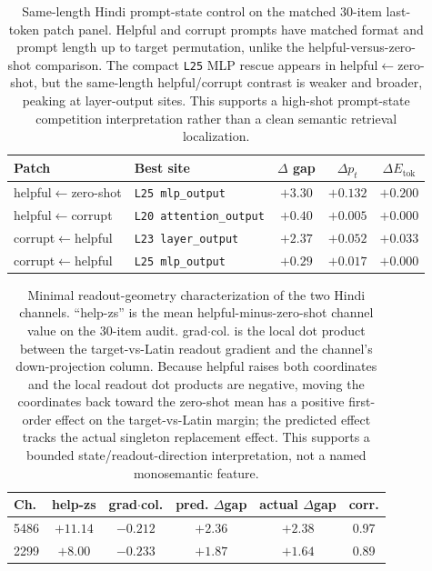 \documentclass{article}
\begin{document}
\begin{table}[H]
\centering
\small
\setlength{\tabcolsep}{5pt}
\begin{tabular}{llccc}
\toprule
\textbf{Patch} & \textbf{Best site} & \textbf{$\Delta$ gap} & \textbf{$\Delta p_t$} & \textbf{$\Delta E_{\mathrm{tok}}$} \\
\midrule
helpful$\leftarrow$zero-shot & \texttt{L25 mlp\_output} & $+3.30$ & $+0.132$ & $+0.200$ \\
helpful$\leftarrow$corrupt & \texttt{L20 attention\_output} & $+0.40$ & $+0.005$ & $+0.000$ \\
corrupt$\leftarrow$helpful & \texttt{L23 layer\_output} & $+2.37$ & $+0.052$ & $+0.033$ \\
corrupt$\leftarrow$helpful & \texttt{L25 mlp\_output} & $+0.29$ & $+0.017$ & $+0.000$ \\
\bottomrule
\end{tabular}
\caption{Same-length Hindi prompt-state control on the matched 30-item last-token patch panel. Helpful and corrupt prompts have matched format and prompt length up to target permutation, unlike the helpful-versus-zero-shot comparison. The compact \texttt{L25} MLP rescue appears in helpful$\leftarrow$zero-shot, but the same-length helpful/corrupt contrast is weaker and broader, peaking at layer-output sites. This supports a high-shot prompt-state competition interpretation rather than a clean semantic retrieval localization.}
\label{tab:hindi_same_length}
\end{table}

\begin{table}[H]
\centering
\small
\setlength{\tabcolsep}{6pt}
\begin{tabular}{lccccc}
\toprule
\textbf{Ch.} & \textbf{help-zs} & \textbf{grad$\cdot$col.} & \textbf{pred. $\Delta$gap} & \textbf{actual $\Delta$gap} & \textbf{corr.} \\
\midrule
5486 & $+11.14$ & $-0.212$ & $+2.36$ & $+2.38$ & 0.97 \\
2299 & $+8.00$  & $-0.233$ & $+1.87$ & $+1.64$ & 0.89 \\
\bottomrule
\end{tabular}
\caption{Minimal readout-geometry characterization of the two Hindi channels. ``help-zs'' is the mean helpful-minus-zero-shot channel value on the 30-item audit. grad$\cdot$col. is the local dot product between the target-vs-Latin readout gradient and the channel's down-projection column. Because helpful raises both coordinates and the local readout dot products are negative, moving the coordinates back toward the zero-shot mean has a positive first-order effect on the target-vs-Latin margin; the predicted effect tracks the actual singleton replacement effect. This supports a bounded state/readout-direction interpretation, not a named monosemantic feature.}
\label{tab:hindi_channel_readout}
\end{table}
\enlargethispage{6\baselineskip}
\end{document}
